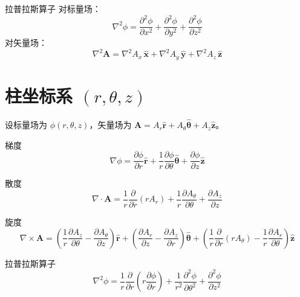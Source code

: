 \documentclass[12pt,a4paper,openany,oneside]{book}
\newcommand{\vect}[1]{\bm{#1}}
\newcommand{\unitvec}[1]{\hat{\vect{#1}}}
\newcommand{\grad}{\nabla}
\newcommand{\curl}{\nabla\times}
\newcommand{\divg}{\nabla\cdot}
\newcommand{\lap}{\nabla^2}
\begin{document}
\begin{definition}{拉普拉斯算子}{}{}
对标量场：
\begin{equation}
\lap\phi = \frac{\partial^2 \phi}{\partial x^2} + \frac{\partial^2 \phi}{\partial y^2} + \frac{\partial^2 \phi}{\partial z^2}
\end{equation}
对矢量场：
\begin{equation}
\lap\vect{A} = \lap A_x\,\unitvec{x} + \lap A_y\,\unitvec{y} + \lap A_z\,\unitvec{z}
\end{equation}
\end{definition}


\section{柱坐标系 $(r,\theta,z)$}

设标量场为 $\phi(r,\theta,z)$，矢量场为 $\vect{A}=A_r\unitvec{r}+A_\theta\unitvec{\theta}+A_z\unitvec{z}$。

\begin{definition}{梯度}{}{}
\begin{equation}
\grad\phi = \frac{\partial \phi}{\partial r}\unitvec{r} + \frac{1}{r}\frac{\partial \phi}{\partial \theta}\unitvec{\theta} + \frac{\partial \phi}{\partial z}\unitvec{z}
\end{equation}
\end{definition}

\begin{definition}{散度}{}{}
\begin{equation}
\divg\vect{A} = \frac{1}{r}\frac{\partial }{\partial r}(rA_r) + \frac{1}{r}\frac{\partial A_\theta}{\partial \theta} + \frac{\partial A_z}{\partial z}
\end{equation}
\end{definition}

\begin{definition}{旋度}{}{}
\begin{equation}
\curl\vect{A} =
\left(\frac{1}{r}\frac{\partial A_z}{\partial \theta}-\frac{\partial A_\theta}{\partial z}\right)\unitvec{r}
+ \left(\frac{\partial A_r}{\partial z}-\frac{\partial A_z}{\partial r}\right)\unitvec{\theta}
+ \left(\frac{1}{r}\frac{\partial }{\partial r}(rA_\theta)-\frac{1}{r}\frac{\partial A_r}{\partial \theta}\right)\unitvec{z}
\end{equation}
\end{definition}

\begin{definition}{拉普拉斯算子}{}{}
\begin{equation}
\lap\phi = \frac{1}{r}\frac{\partial }{\partial r}\!\left(r\frac{\partial \phi}{\partial r}\right)
+ \frac{1}{r^2}\frac{\partial^2 \phi}{\partial \theta^2} + \frac{\partial^2 \phi}{\partial z^2}
\end{equation}
\end{definition}
\end{document}
